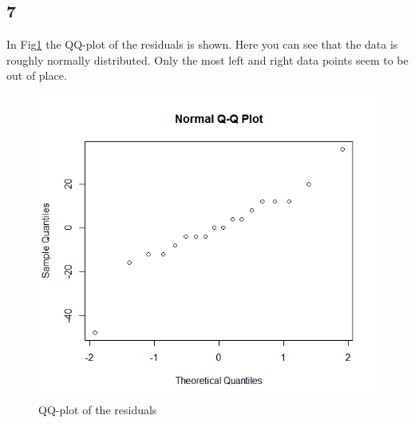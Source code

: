 \documentclass{article}
\begin{document}
    \subsection*{7}
      In Fig\ref{fig:QQRes} the QQ-plot of the residuals is shown.
      Here you can see that the data is roughly normally distributed.
      Only the most left and right data points seem to be out of place.
      \begin{figure}[H]
          \centering
          \includegraphics[scale=0.4]{../results/QQResEnvHum.png} 
          \caption{QQ-plot of the residuals}
          \label{fig:QQRes}
      \end{figure}
    
\end{document}
